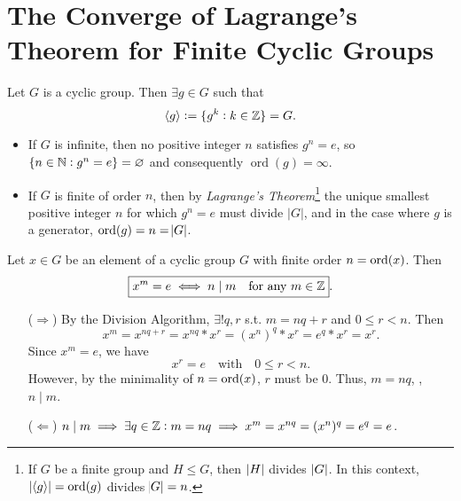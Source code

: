 \documentclass[11pt,openany]{article}
\begin{document}
\newpage
\section*{The Converge of Lagrange's Theorem for Finite Cyclic Groups}
\begin{remark*}
Let $G$ is a cyclic group. Then \(\exists g \in G \) such that \[
\langle g \rangle: = \{ g^k : k \in \mathbb{Z} \} = G.
\] \begin{itemize}
	\item If \( G \) is infinite, then no positive integer \( n \) satisfies \( g^n = e \), so $\set{n\in\mathbb{N}:g^n=e}=\varnothing$ and consequently $\operatorname{ord}(g) = \infty$.
	\item If \( G \) is finite of order \( n \), then by \emph{Lagrange’s Theorem}\footnote{\; 
		If $G$ be a finite group and $H\leq G$, then $\abs[0]{H}$ divides $\abs[0]{G}$. In this context,
		$\abs[0]{\langle g \rangle}=\operatorname*{ord}(g)$ divides $\abs{G}=n$.} the unique smallest positive integer \( n \) for which \( g^n = e \) must divide \(|G|\), and in the case where \( g \) is a generator, \(\operatorname*{ord}(g) = n = \abs{G}\).
\end{itemize}
\end{remark*}
\vfill
\begin{remark*}
	Let $x\in G$ be an element of a cyclic group $G$ with finite order $n=\operatorname*{ord}(x)$. Then \[
	\boxed{x^m=e\iff n\mid m\quad\text{for any $m\in\mathbb{Z}$}}.
	\]
	\begin{itemize}
		\item[($\Rightarrow$)] By the Division Algorithm, $\exists! q,r$ s.t. $m=nq+r$ and $0\leq r<n$. Then \[
		x^m=x^{nq+r}=x^{nq}\ast x^r=(x^n)^q\ast x^r=e^q\ast x^r=x^r.
		\] Since $x^m=e$, we have \[
		x^r=e\quad\text{with}\quad 0\leq r<n.
		\] However, by the minimality of $n=\operatorname*{ord}(x)$, $r$ must be 0. Thus, $m=nq$, \ie, $n\mid m$.
		\item[($\Leftarrow$)] $n\mid m\implies \exists q\in\mathbb{Z}: m=nq\implies x^m=x^{nq}=(x^{n})^q=e^q=e$.
	\end{itemize}
\end{remark*}
\end{document}
